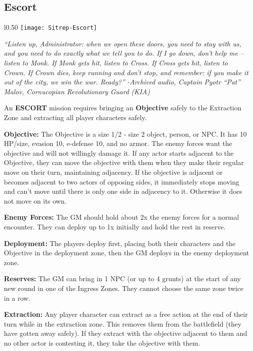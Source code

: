 \newpage
\subsection{Escort}
\begin{wrapfigure}{l}{0.50\textwidth}
  \centering
  \texttt{[image: Sitrep-Escort]}
\end{wrapfigure}
\textit{“Listen up, Administrator: when we open these doors, you need to stay with us, and you need to do exactly what we tell you to do. If I go down, don’t help me -- listen to Monk. If Monk gets hit, listen to Cross. If Cross gets hit, listen to Crown. If Crown dies, keep running and don’t stop, and remember: if you make it out of the city, we win the war. Ready?” -Archived audio, Captain Pyotr “Pat” Malov, Cornucopian Revolutionary Guard (KIA)}

An \textbf{ESCORT} mission requires bringing an \textbf{Objective} safely to the Extraction Zone and extracting all player characters safely.

\textbf{Objective:} The Objective is a size 1/2 - size 2 object, person, or NPC. It has 10 HP/size, evasion 10, e-defense 10, and no armor. The enemy forces want the objective and will not willingly damage it. If any actor starts adjacent to the Objective, they can move the objective with them when they make their regular move on their turn, maintaining adjacency. If the objective is adjacent or becomes adjacent to two actors of opposing sides, it immediately stops moving and can’t move until there is only one side in adjacency to it. Otherwise it does not move on its own.

\textbf{Enemy Forces:} The GM should hold about 2x the enemy forces for a normal encounter. They can deploy up to 1x initially and hold the rest in reserve.

\textbf{Deployment:} The players deploy first, placing both their characters and the Objective in the deployment zone, then the GM deploys in the enemy deployment zone.

\textbf{Reserves:} The GM can bring in 1 NPC (or up to 4 grunts) at the start of any new round in one of the Ingress Zones. They cannot choose the same zone twice in a row.

\textbf{Extraction:} Any player character can extract as a free action at the end of their turn while in the extraction zone. This removes them from the battlefield (they have gotten away safely). If they extract with the objective adjacent to them and no other actor is contesting it, they take the objective with them.

